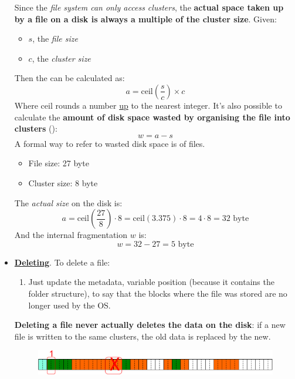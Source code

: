 \begin{itemize}
    Since the \emph{file system can only access clusters}, the \textbf{actual space taken up by a file on a disk is always a multiple of the cluster size}. Given:
    \begin{itemize}
        \item $s$, the \emph{file size}
        \item $c$, the \emph{cluster size}
    \end{itemize}
    Then the  can be calculated as:
    \begin{equation}
        a = \mathrm{ceil}\left(\dfrac{s}{c}\right) \times c
    \end{equation}
    Where $\mathrm{ceil}$ rounds a number \underline{up} to the nearest integer. It's also possible to calculate the \textbf{amount of disk space wasted by organising the file into clusters} ():
    \begin{equation}
        w = a - s
    \end{equation}
    A formal way to refer to wasted disk space is  of files.
    \newpage
    \begin{examplebox}
        \begin{itemize}
            \item File size: 27 byte
            \item Cluster size: 8 byte
        \end{itemize}
        The \emph{actual size} on the disk is:
        \begin{equation*}
            a = \mathrm{ceil}\left(\dfrac{27}{8}\right) \cdot 8 = \mathrm{ceil}\left(3.375\right) \cdot 8 = 4 \cdot 8 = 32 \text{ byte}
        \end{equation*}
        And the internal fragmentation $w$ is:
        \begin{equation*}
            w = 32 - 27 = 5 \text{ byte}
        \end{equation*}
    \end{examplebox}

    \item \underline{\textbf{Deleting}}. To delete a file:
    \begin{enumerate}
        \item Just update the metadata, variable position (because it contains the folder structure), to say that the blocks where the file was stored are no longer used by the OS.
    \end{enumerate}
    \textbf{Deleting a file never actually deletes the data on the disk}: if a new file is written to the same clusters, the old data is replaced by the new.
    \begin{figure}[!htp]
        \centering
        \includegraphics[width=\textwidth]{img/files-4.pdf}
    \end{figure}
    

\end{itemize}

